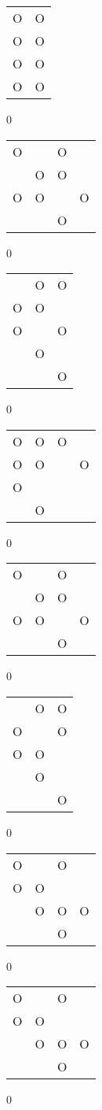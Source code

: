 \begin{tabular}{|m{0.2cm}m{0.2cm}|}\hline
O&O\\
O&O\\
O&O\\
O&O\\
\hline\end{tabular}0
\begin{tabular}{|m{0.2cm}m{0.2cm}m{0.2cm}m{0.2cm}|}\hline
O& &O& \\
 &O&O& \\
O&O& &O\\
 & &O& \\
\hline\end{tabular}0
\begin{tabular}{|m{0.2cm}m{0.2cm}m{0.2cm}|}\hline
 &O&O\\
O&O& \\
O& &O\\
 &O& \\
 & &O\\
\hline\end{tabular}0
\begin{tabular}{|m{0.2cm}m{0.2cm}m{0.2cm}m{0.2cm}|}\hline
O&O&O& \\
O&O& &O\\
O& & & \\
 &O& & \\
\hline\end{tabular}0
\begin{tabular}{|m{0.2cm}m{0.2cm}m{0.2cm}m{0.2cm}|}\hline
O& &O& \\
 &O&O& \\
O&O& &O\\
 & &O& \\
\hline\end{tabular}0
\begin{tabular}{|m{0.2cm}m{0.2cm}m{0.2cm}|}\hline
 &O&O\\
O& &O\\
O&O& \\
 &O& \\
 & &O\\
\hline\end{tabular}0
\begin{tabular}{|m{0.2cm}m{0.2cm}m{0.2cm}m{0.2cm}|}\hline
O& &O& \\
O&O& & \\
 &O&O&O\\
 & &O& \\
\hline\end{tabular}0
\begin{tabular}{|m{0.2cm}m{0.2cm}m{0.2cm}m{0.2cm}|}\hline
O& &O& \\
O&O& & \\
 &O&O&O\\
 & &O& \\
\hline\end{tabular}0
